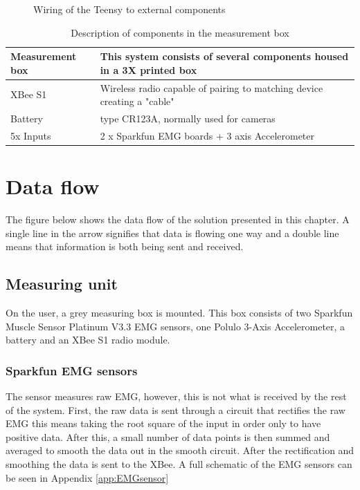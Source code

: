 \begin{figure}[H]
    \centering

    \caption{Wiring of the Teensy to external components}
    \label{fig:motorSel}
\end{figure}
\begin{table}[H]
\begin{tabular}{|P{3cm}||P{10cm}|}
\hline
\textbf{Measurement box} & This system consists of several components housed in a 3X printed box   \\ \hline
XBee S1                  & Wireless radio capable of pairing to matching device creating a "cable" \\ \hline
Battery                  & type CR123A, normally used for cameras                                  \\ \hline
5x Inputs                & 2 x Sparkfun EMG boards + 3 axis Accelerometer                         \\ \hline
\end{tabular}%
\caption{Description of components in the measurement box}
\label{tableBOX}
\end{table}
\section{Data flow}
The figure below shows the data flow of the solution presented in this chapter. A single line in the arrow signifies that data is flowing one way and a double line means that information is both being sent and received.

\subsection{Measuring unit}
On the user, a grey measuring box is mounted. This box consists of two Sparkfun Muscle Sensor Platinum V3.3 EMG sensors, one Polulo 3-Axis Accelerometer, a battery and an XBee S1 radio module.
\subsubsection{Sparkfun EMG sensors}
The sensor measures raw EMG, however, this is not what is received by the rest of the system. First, the raw data is sent through a circuit that rectifies the raw EMG this means taking the root square of the input in order only to have positive data. After this, a small number of data points is then summed and averaged to smooth the data out in the smooth circuit. After the rectification and smoothing the data is sent to the XBee. A full schematic of the EMG sensors can be seen in Appendix \ref{app:EMGsensor}
